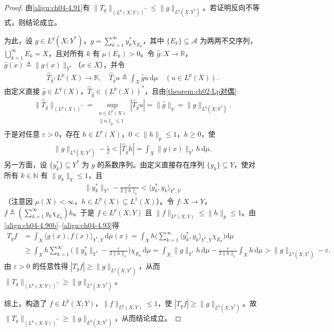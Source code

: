 \documentclass[../../main.tex]{subfiles}%
\begin{document}
\begin{proof}
由\eqref{align:ch04-4.91}有 $\|T_g\|_{(L^p(X;Y))^*}\leqslant\|g\|_{L^q(X;Y^*)}$。若证明反向不等式，则结论成立。

为此，设 $g\in L^q(X;Y^*)$，$g=\sum_{k=1}^\infty y_k^*\chi_{E_k}$，其中 $\{E_k\}\subseteq\mathcal{A}$ 为两两不交序列，$\bigcup_{k=1}^\infty E_k=X$，且对所有 $k$ 有 $\mu(E_k)>0$。令 $\hat g:X\to\mathbb{R}$，$\hat g(x)\triangleq\|g(x)\|_{Y^*}$（$x\in X$），并令
\begin{align*}
\widehat T_{\hat g}:L^p(X)\to\mathbb{R},\quad \widehat T_{\hat g}u\triangleq\int_X\hat gu\,\mathrm{d}\mu\quad(u\in L^p(X)).
\end{align*}
由定义直接 $\hat g\in L^q(X)$，$\widehat T_{\hat g}\in(L^p(X))^*$，且由\cref{theorem:ch02-Lp对偶}
\begin{align*}
\|\widehat T_{\hat g}\|_{(L^p(X))^*}=\sup_{\substack{u\in L^p(X)\\\|u\|_p\leqslant1}}|\widehat T_{\hat g}u|=\|\hat g\|_q=\|g\|_{L^q(X;Y^*)}.
\end{align*}
于是对任意 $\varepsilon>0$，存在 $h\in L^p(X)$，$0<\|h\|_p\leqslant1$，$h\geqslant0$，使
\begin{align}
\|g\|_{L^q(X;Y^*)}-\frac{\varepsilon}{2}<|\widehat T_{\hat g}h|=\int_X\|g(x)\|_{Y^*}h\,\mathrm{d}\mu. \label{align:ch04-4.92}
\end{align}
另一方面，设 $\{y_k^*\}\subseteq Y^*$ 为 $g$ 的系数序列。由定义直接存在序列 $\{y_k\}\subseteq Y$，使对所有 $k\in\mathbb{N}$ 有 $\|y_k\|_Y\leqslant1$，且
\begin{align}
\|y_k^*\|_{Y^*}-\frac{\varepsilon}{2\|h\|_1}<\langle y_k^*,y_k\rangle_{Y^*,Y} \label{align:ch04-4.93}
\end{align}
（注意因 $\mu(X)<\infty$，$h\in L^p(X)\subseteq L^1(X)$）。令 $f:X\to Y$，$f\triangleq(\sum_{k=1}^\infty y_k\chi_{E_k})h$。于是 $f\in L^p(X;Y)$ 且 $\|f\|_{L^p(X;Y)}\leqslant\|h\|_p\leqslant1$。由\eqref{align:ch04-4.90b}--\eqref{align:ch04-4.93}得
\begin{align*}
T_gf&=\int_X\langle g(x),f(x)\rangle_{Y^*,Y}\,\mathrm{d}\mu(x)
=\int_Xh\Big(\sum_{k=1}^\infty\langle y_k^*,y_k\rangle_{Y^*,Y}\chi_{E_k}\Big)\mathrm{d}\mu\\
&\geqslant\int_Xh\sum_{k=1}^\infty\Big(\|y_k^*\|_{Y^*}-\frac{\varepsilon}{2\|h\|_1}\Big)\chi_{E_k}\,\mathrm{d}\mu
=\int_X\|g\|_{Y^*}h\,\mathrm{d}\mu-\frac{\varepsilon}{2\|h\|_1}\int_Xh\,\mathrm{d}\mu>\|g\|_{L^q(X;Y^*)}-\varepsilon.
\end{align*}
由 $\varepsilon>0$ 的任意性得 $|T_gf|\geqslant\|g\|_{L^q(X;Y^*)}$，从而 $\|T_g\|_{(L^p(X;Y))^*}\geqslant\|g\|_{L^q(X;Y^*)}$。

综上，构造了 $f\in L^p(X;Y)$，$\|f\|_{L^p(X;Y)}\leqslant1$，使 $|T_gf|\geqslant\|g\|_{L^q(X;Y^*)}$。故 $\|T_g\|_{(L^p(X;Y))^*}\geqslant\|g\|_{L^q(X;Y^*)}$，从而结论成立。
\end{proof}
\end{document}
